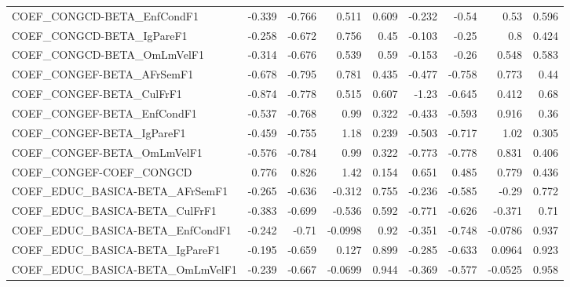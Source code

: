 \begin{tabular}{lrrrrrrrr}
COEF\_CONGCD-BETA\_EnfCondF1            &      -0.339 &       -0.766 &   0.511 &    0.609 &     -0.232 &       -0.54 &         0.53 &         0.596 \\
COEF\_CONGCD-BETA\_IgPareF1             &      -0.258 &       -0.672 &   0.756 &     0.45 &     -0.103 &       -0.25 &          0.8 &         0.424 \\
COEF\_CONGCD-BETA\_OmLmVelF1            &      -0.314 &       -0.676 &   0.539 &     0.59 &     -0.153 &       -0.26 &        0.548 &         0.583 \\
COEF\_CONGEF-BETA\_AFrSemF1             &      -0.678 &       -0.795 &   0.781 &    0.435 &     -0.477 &      -0.758 &        0.773 &          0.44 \\
COEF\_CONGEF-BETA\_CulFrF1              &      -0.874 &       -0.778 &   0.515 &    0.607 &      -1.23 &      -0.645 &        0.412 &          0.68 \\
COEF\_CONGEF-BETA\_EnfCondF1            &      -0.537 &       -0.768 &    0.99 &    0.322 &     -0.433 &      -0.593 &        0.916 &          0.36 \\
COEF\_CONGEF-BETA\_IgPareF1             &      -0.459 &       -0.755 &    1.18 &    0.239 &     -0.503 &      -0.717 &         1.02 &         0.305 \\
COEF\_CONGEF-BETA\_OmLmVelF1            &      -0.576 &       -0.784 &    0.99 &    0.322 &     -0.773 &      -0.778 &        0.831 &         0.406 \\
COEF\_CONGEF-COEF\_CONGCD               &       0.776 &        0.826 &    1.42 &    0.154 &      0.651 &       0.485 &        0.779 &         0.436 \\
COEF\_EDUC\_BASICA-BETA\_AFrSemF1        &      -0.265 &       -0.636 &  -0.312 &    0.755 &     -0.236 &      -0.585 &        -0.29 &         0.772 \\
COEF\_EDUC\_BASICA-BETA\_CulFrF1         &      -0.383 &       -0.699 &  -0.536 &    0.592 &     -0.771 &      -0.626 &       -0.371 &          0.71 \\
COEF\_EDUC\_BASICA-BETA\_EnfCondF1       &      -0.242 &        -0.71 & -0.0998 &     0.92 &     -0.351 &      -0.748 &      -0.0786 &         0.937 \\
COEF\_EDUC\_BASICA-BETA\_IgPareF1        &      -0.195 &       -0.659 &   0.127 &    0.899 &     -0.285 &      -0.633 &       0.0964 &         0.923 \\
COEF\_EDUC\_BASICA-BETA\_OmLmVelF1       &      -0.239 &       -0.667 & -0.0699 &    0.944 &     -0.369 &      -0.577 &      -0.0525 &         0.958 \\

\end{tabular}
